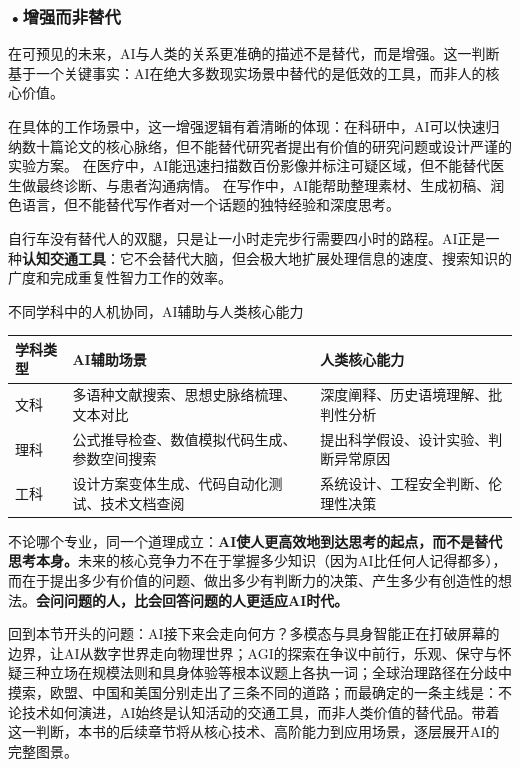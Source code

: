 \subsubsection*{\textbf{•增强而非替代}}

在可预见的未来，AI与人类的关系更准确的描述不是替代，而是增强。这一判断基于一个关键事实：AI在绝大多数现实场景中替代的是低效的工具，而非人的核心价值。

在具体的工作场景中，这一增强逻辑有着清晰的体现：在科研中，AI可以快速归纳数十篇论文的核心脉络，但不能替代研究者提出有价值的研究问题或设计严谨的实验方案。
在医疗中，AI能迅速扫描数百份影像并标注可疑区域，但不能替代医生做最终诊断、与患者沟通病情。
在写作中，AI能帮助整理素材、生成初稿、润色语言，但不能替代写作者对一个话题的独特经验和深度思考。

自行车没有替代人的双腿，只是让一小时走完步行需要四小时的路程。AI正是一种\textbf{认知交通工具}：它不会替代大脑，但会极大地扩展处理信息的速度、搜索知识的广度和完成重复性智力工作的效率。

\begin{formalTable}
\caption{不同学科中的人机协同，AI辅助与人类核心能力}
\label{tab:ch1_04}
\begin{tabularx}{\textwidth}{@{}YYY@{}}
\toprule
\textbf{学科类型} & \textbf{AI辅助场景} & \textbf{人类核心能力} \\
\midrule
文科 & 多语种文献搜索、思想史脉络梳理、文本对比 & 深度阐释、历史语境理解、批判性分析 \\
理科 & 公式推导检查、数值模拟代码生成、参数空间搜索 & 提出科学假设、设计实验、判断异常原因 \\
工科 & 设计方案变体生成、代码自动化测试、技术文档查阅 & 系统设计、工程安全判断、伦理性决策 \\
\bottomrule
\end{tabularx}
\end{formalTable}

不论哪个专业，同一个道理成立：\textbf{AI使人更高效地到达思考的起点，而不是替代思考本身。}未来的核心竞争力不在于掌握多少知识（因为AI比任何人记得都多），而在于提出多少有价值的问题、做出多少有判断力的决策、产生多少有创造性的想法。\textbf{会问问题的人，比会回答问题的人更适应AI时代。}

回到本节开头的问题：AI接下来会走向何方？多模态与具身智能正在打破屏幕的边界，让AI从数字世界走向物理世界；AGI的探索在争议中前行，乐观、保守与怀疑三种立场在规模法则和具身体验等根本议题上各执一词；全球治理路径在分歧中摸索，欧盟、中国和美国分别走出了三条不同的道路；而最确定的一条主线是：不论技术如何演进，AI始终是认知活动的交通工具，而非人类价值的替代品。带着这一判断，本书的后续章节将从核心技术、高阶能力到应用场景，逐层展开AI的完整图景。


